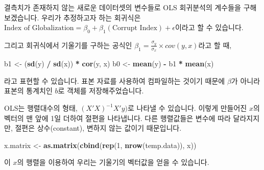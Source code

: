 \documentclass[]{book}
\newenvironment{Shaded}{\begin{snugshade}}{\end{snugshade}}
\newcommand{\CommentTok}[1]{\textcolor[rgb]{0.56,0.35,0.01}{\textit{#1}}}
\newcommand{\DecValTok}[1]{\textcolor[rgb]{0.00,0.00,0.81}{#1}}
\newcommand{\KeywordTok}[1]{\textcolor[rgb]{0.13,0.29,0.53}{\textbf{#1}}}
\newcommand{\NormalTok}[1]{#1}
\newcommand{\OperatorTok}[1]{\textcolor[rgb]{0.81,0.36,0.00}{\textbf{#1}}}
\newcommand{\StringTok}[1]{\textcolor[rgb]{0.31,0.60,0.02}{#1}}
\begin{document}
결측치가 존재하지 않는 새로운 데이터셋의 변수들로 OLS 회귀분석의 계수들을 구해보겠습니다. 우리가 추정하고자 하는 회귀식은 \(\text{Index of Globalization} = \beta_0 + \beta_1(\text{Corrupt Index}) + \epsilon\)이라고 할 수 있습니다.

\begin{Shaded}
\end{Shaded}

그리고 회귀식에서 기울기를 구하는 공식인 \(\beta_1 = \frac{\sigma_y}{\sigma_x} \times cov(y, x)\)라고 할 때,

\begin{Shaded}
\begin{Highlighting}[]
\NormalTok{b1 <-}\StringTok{ }\NormalTok{(}\KeywordTok{sd}\NormalTok{(y) }\OperatorTok{/}\StringTok{ }\KeywordTok{sd}\NormalTok{(x)) }\OperatorTok{*}\StringTok{ }\KeywordTok{cor}\NormalTok{(y, x)}
\NormalTok{b0 <-}\StringTok{ }\KeywordTok{mean}\NormalTok{(y) }\OperatorTok{-}\StringTok{ }\NormalTok{b1 }\OperatorTok{*}\StringTok{ }\KeywordTok{mean}\NormalTok{(x)}
\end{Highlighting}
\end{Shaded}

라고 표현할 수 있습니다. 표본 자료를 사용하여 컴파일하는 것이기 때문에 \(\beta\)가 아니라 표본의 통계치인 \(b\)로 객체를 저장해주었습니다.

OLS는 행렬대수의 형태, \((X'X)^{-1}X'y)\)로 나타낼 수 있습니다. 이렇게 만들어진 \(x\)의 벡터의 맨 앞에 1일 더하여 절편을 나타냅니다. 다른 행렬값들은 변수에 따라 달라지지만, 절편은 상수(constant), 변하지 않는 값이기 때문입니다.

\begin{Shaded}
\begin{Highlighting}[]
\NormalTok{x.matrix <-}\StringTok{ }\KeywordTok{as.matrix}\NormalTok{(}\KeywordTok{cbind}\NormalTok{(}\KeywordTok{rep}\NormalTok{(}\DecValTok{1}\NormalTok{, }\KeywordTok{nrow}\NormalTok{(temp.data)), x))}
\end{Highlighting}
\end{Shaded}

이 \(x\)의 행렬을 이용하여 우리는 기울기의 벡터값을 얻을 수 있습니다.
\end{document}
